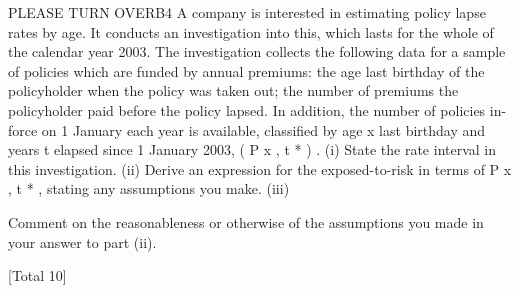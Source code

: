 \documentclass[a4paper,12pt]{article}
\begin{document}
\begin{enumerate}





PLEASE TURN OVERB4
A company is interested in estimating policy lapse rates by age. It conducts an
investigation into this, which lasts for the whole of the calendar year 2003. The
investigation collects the following data for a sample of policies which are funded by
annual premiums:
the age last birthday of the policyholder when the policy was taken out;
the number of premiums the policyholder paid before the policy lapsed.
In addition, the number of policies in-force on 1 January each year is available,
classified by age x last birthday and years t elapsed since 1 January 2003, ( P x , t * ) .
(i) State the rate interval in this investigation.
(ii) Derive an expression for the exposed-to-risk in terms of P x , t * , stating any
assumptions you make.
(iii)


Comment on the reasonableness or otherwise of the assumptions you made in
your answer to part (ii).

[Total 10]




\n





\end{enumerate}
\end{document}
